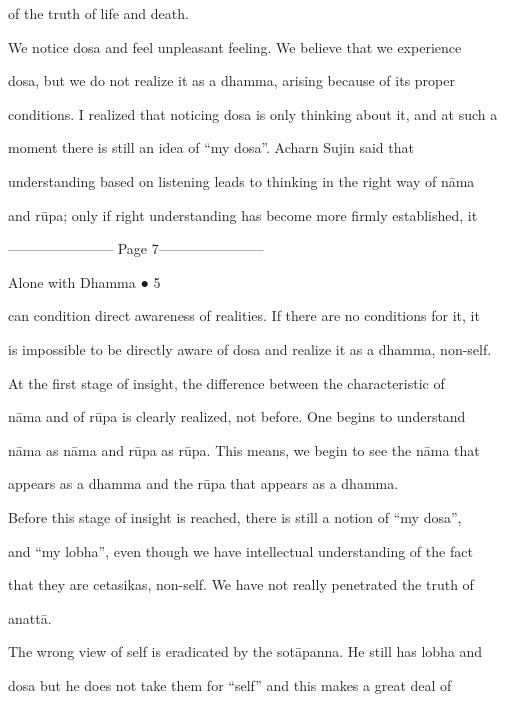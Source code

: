 of the truth of life and death. 



We  notice  dosa  and  feel  unpleasant  feeling. We  believe  that we  experience  

dosa,  but   we   do  not  realize  it  as  a  dhamma,  arising  because   of  its  proper  

conditions. I realized that noticing dosa is only thinking about it, and at such a  

moment   there   is   still   an   idea   of   “my   dosa”.   Acharn   Sujin   said   that  

understanding based on listening leads to thinking in the right way  of nāma  

and rūpa; only if right understanding has become more firmly established, it  


----------------------- Page 7-----------------------

                                                                   Alone with Dhamma ● 5 



can condition direct awareness of realities. If there are no conditions for it, it  

is impossible to be directly aware of dosa and realize it as a dhamma, non-self.  

   At   the  first  stage  of  insight,  the  difference  between  the   characteristic  of  

nāma  and  of  rūpa  is  clearly  realized,  not  before.  One  begins  to  understand  

nāma as nāma and rūpa as rūpa. This means, we begin to see the nāma that  

appears as a dhamma and the rūpa that appears as a dhamma. 

   Before this  stage of insight is reached, there  is  still  a notion of  “my dosa”,  

and  “my  lobha”,  even though we have  intellectual understanding  of the  fact  

that  they  are  cetasikas,  non-self. We have  not  really  penetrated the  truth  of  

anattā. 



The wrong view of self is eradicated by the sotāpanna. He still has lobha and  

dosa  but   he  does  not  take  them  for  “self”  and  this  makes  a  great  deal  of  

